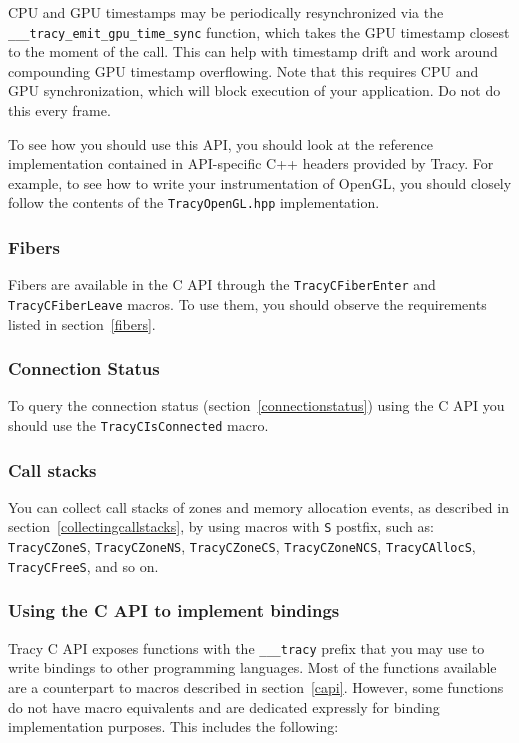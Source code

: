 \documentclass[hidelinks,titlepage,a4paper,twoside]{article}
\begin{document}
CPU and GPU timestamps may be periodically resynchronized via the \texttt{\_\_\_tracy\_emit\_gpu\_time\_sync} function, which takes the GPU timestamp closest to the moment of the call. This can help with timestamp drift and work around compounding GPU timestamp overflowing. Note that this requires CPU and GPU synchronization, which will block execution of your application. Do not do this every frame.

To see how you should use this API, you should look at the reference implementation contained in API-specific C++ headers provided by Tracy. For example, to see how to write your instrumentation of OpenGL, you should closely follow the contents of the \texttt{TracyOpenGL.hpp} implementation.

\subsubsection{Fibers}

Fibers are available in the C API through the \texttt{TracyCFiberEnter} and \texttt{TracyCFiberLeave} macros. To use them, you should observe the requirements listed in section~\ref{fibers}.

\subsubsection{Connection Status}

To query the connection status (section~\ref{connectionstatus}) using the C API you should use the \texttt{TracyCIsConnected} macro.

\subsubsection{Call stacks}

You can collect call stacks of zones and memory allocation events, as described in section~\ref{collectingcallstacks}, by using macros with \texttt{S} postfix, such as: \texttt{TracyCZoneS}, \texttt{TracyCZoneNS}, \texttt{TracyCZoneCS}, \texttt{TracyCZoneNCS}, \texttt{TracyCAllocS}, \texttt{TracyCFreeS}, and so on.

\subsubsection{Using the C API to implement bindings}
\label{capibindings}

Tracy C API exposes functions with the \texttt{\_\_\_tracy} prefix that you may use to write bindings to other programming languages. Most of the functions available are a counterpart to macros described in section~\ref{capi}. However, some functions do not have macro equivalents and are dedicated expressly for binding implementation purposes. This includes the following:
\end{document}
